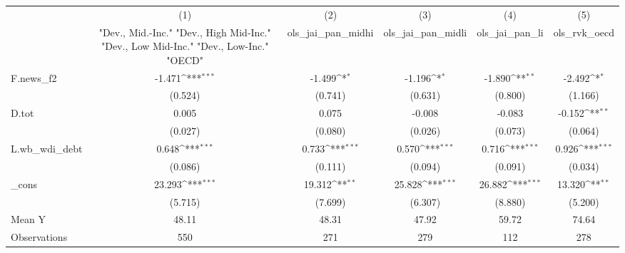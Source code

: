 {
\def\sym#1{\ifmmode^{#1}\else\(^{#1}\)\fi}
\begin{tabular}{l*{5}{c}}
\toprule
            &\multicolumn{1}{c}{(1)}&\multicolumn{1}{c}{(2)}&\multicolumn{1}{c}{(3)}&\multicolumn{1}{c}{(4)}&\multicolumn{1}{c}{(5)}\\
            &\multicolumn{1}{c}{ "Dev., Mid.-Inc." "Dev., High Mid-Inc." "Dev., Low Mid-Inc." "Dev., Low-Inc." "OECD" }&\multicolumn{1}{c}{ols\_jai\_pan\_midhi}&\multicolumn{1}{c}{ols\_jai\_pan\_midli}&\multicolumn{1}{c}{ols\_jai\_pan\_li}&\multicolumn{1}{c}{ols\_rvk\_oecd}\\
\midrule
F.news\_f2   &      -1.471\sym{***}&      -1.499\sym{*}  &      -1.196\sym{*}  &      -1.890\sym{**} &      -2.492\sym{*}  \\
            &     (0.524)         &     (0.741)         &     (0.631)         &     (0.800)         &     (1.166)         \\
\addlinespace
D.tot       &       0.005         &       0.075         &      -0.008         &      -0.083         &      -0.152\sym{**} \\
            &     (0.027)         &     (0.080)         &     (0.026)         &     (0.073)         &     (0.064)         \\
\addlinespace
L.wb\_wdi\_debt&       0.648\sym{***}&       0.733\sym{***}&       0.570\sym{***}&       0.716\sym{***}&       0.926\sym{***}\\
            &     (0.086)         &     (0.111)         &     (0.094)         &     (0.091)         &     (0.034)         \\
\addlinespace
\_cons      &      23.293\sym{***}&      19.312\sym{**} &      25.828\sym{***}&      26.882\sym{***}&      13.320\sym{**} \\
            &     (5.715)         &     (7.699)         &     (6.307)         &     (8.880)         &     (5.200)         \\
\midrule
Mean Y      &       48.11         &       48.31         &       47.92         &       59.72         &       74.64         \\
Observations&         550         &         271         &         279         &         112         &         278         \\
\bottomrule
\end{tabular}
}
